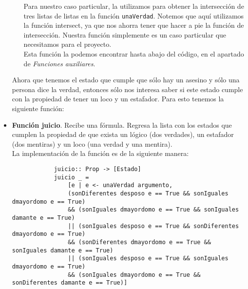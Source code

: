 \documentclass[letterpaper,12pt]{article}
\begin{document}
\begin{itemize}
\begin{itemize}
            Para nuestro caso particular, la utilizamos para obtener la 
            intersección de tres listas de listas en la función
            \texttt{unaVerdad}. Notemos que aquí utilizamos la función 
            intersect, ya que nos ahorra tener que hacer a pie la función de 
            intersección. Nuestra función simplemente es un caso particular 
            que necesitamos para el proyecto. \\
            Esta función la podemos encontrar hasta abajo del código, en el 
            apartado de \textit{Funciones auxiliares}.
        \end{itemize}

        Ahora que tenemos el estado que cumple que sólo hay un asesino y 
        sólo una persona dice la verdad, entonces sólo nos interesa saber 
        si este estado cumple con la propiedad de tener un loco y un 
        estafador. Para esto tenemos la siguiente función:

        \item \textbf{Función juicio}. Recibe una fórmula. Regresa la lista 
        con los estados que cumplen la propiedad de que exista un lógico 
        (dos verdades), un estafador (dos mentiras) y un loco (una verdad y
        una mentira). \\
        La implementación de la función es de la siguiente manera:
        \begin{lstlisting}
            juicio:: Prop -> [Estado]
            juicio _ = 
                [e | e <- unaVerdad argumento, 
                (sonDiferentes desposo e == True && sonIguales dmayordomo e == True) 
                && (sonIguales dmayordomo e == True && sonIguales damante e == True)
                || (sonIguales desposo e == True && sonDiferentes dmayordomo e == True) 
                && (sonDiferentes dmayordomo e == True && sonIguales damante e == True)
                || (sonIguales desposo e == True && sonIguales dmayordomo e == True) 
                && (sonIguales dmayordomo e == True && sonDiferentes damante e == True)]
        \end{lstlisting}


\end{itemize}
\end{document}
